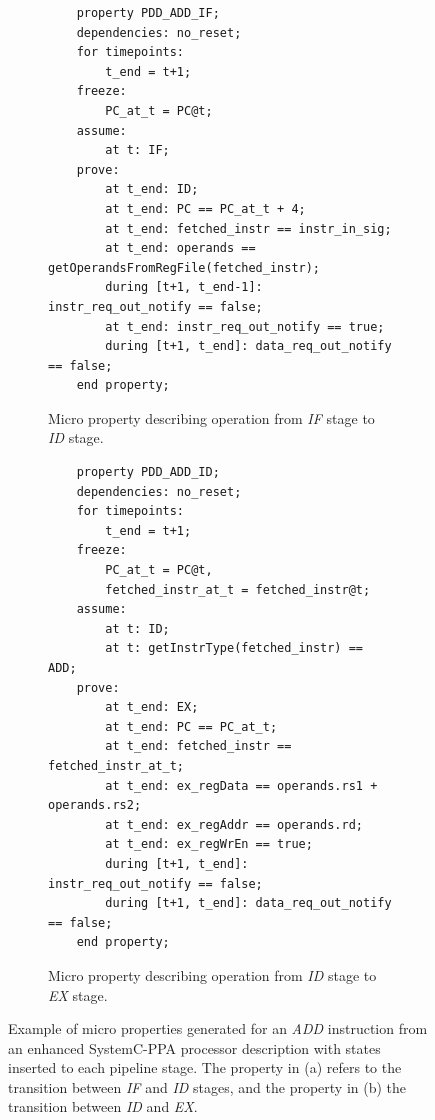 \begin{figure}[htb!]
     \centering
     \begin{subfigure}[b]{\textwidth}
         \begin{lstlisting}
    property PDD_ADD_IF;
    dependencies: no_reset;
    for timepoints:
        t_end = t+1;
    freeze:
        PC_at_t = PC@t;
    assume:
        at t: IF;
    prove:
        at t_end: ID;
        at t_end: PC == PC_at_t + 4;
        at t_end: fetched_instr == instr_in_sig;
        at t_end: operands == getOperandsFromRegFile(fetched_instr);
        during [t+1, t_end-1]: instr_req_out_notify == false;
        at t_end: instr_req_out_notify == true;
        during [t+1, t_end]: data_req_out_notify == false;
    end property;\end{lstlisting}
         \caption{Micro property describing operation from \textit{IF} stage to \textit{ID} stage.}
         \label{subfig:add-if-micro-ppt}
     \end{subfigure}
     \hfill
     \begin{subfigure}[b]{\textwidth}
         \begin{lstlisting}
    property PDD_ADD_ID;
    dependencies: no_reset;
    for timepoints:
        t_end = t+1;
    freeze:
        PC_at_t = PC@t,
        fetched_instr_at_t = fetched_instr@t;
    assume:
        at t: ID;
        at t: getInstrType(fetched_instr) == ADD;
    prove:
        at t_end: EX;
        at t_end: PC == PC_at_t;
        at t_end: fetched_instr == fetched_instr_at_t;
        at t_end: ex_regData == operands.rs1 + operands.rs2;
        at t_end: ex_regAddr == operands.rd;
        at t_end: ex_regWrEn == true;
        during [t+1, t_end]: instr_req_out_notify == false;
        during [t+1, t_end]: data_req_out_notify == false;
    end property;\end{lstlisting}
         \caption{Micro property describing operation from \textit{ID} stage to \textit{EX} stage.}
         \label{subfig:add-id-micro-ppt}
     \end{subfigure}
        \caption{Example of micro properties generated for an \textit{ADD} instruction from an enhanced SystemC-PPA processor description with states inserted to each pipeline stage. The property in (a) refers to the transition between \textit{IF} and \textit{ID} stages, and the property in (b) the transition between \textit{ID} and \textit{EX}.}
        \label{fig:add-if-id-micro-ppt}
\end{figure}

